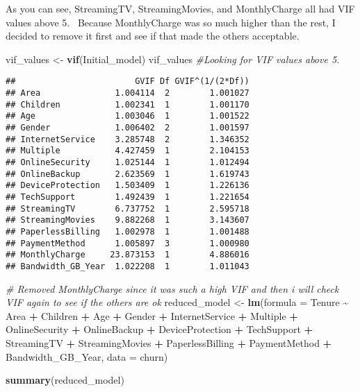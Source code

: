 \documentclass[
]{article}
\newenvironment{Shaded}{\begin{snugshade}}{\end{snugshade}}
\newcommand{\AttributeTok}[1]{\textcolor[rgb]{0.13,0.29,0.53}{#1}}
\newcommand{\CommentTok}[1]{\textcolor[rgb]{0.56,0.35,0.01}{\textit{#1}}}
\newcommand{\FunctionTok}[1]{\textcolor[rgb]{0.13,0.29,0.53}{\textbf{#1}}}
\newcommand{\NormalTok}[1]{#1}
\newcommand{\OtherTok}[1]{\textcolor[rgb]{0.56,0.35,0.01}{#1}}
\newcommand{\SpecialCharTok}[1]{\textcolor[rgb]{0.81,0.36,0.00}{\textbf{#1}}}
\begin{document}
As you can see, StreamingTV, StreamingMovies, and MonthlyCharge all had
VIF values above 5.~ Because MonthlyCharge was so much higher than the
rest, I decided to remove it first and see if that made the others
acceptable.

\begin{Shaded}
\begin{Highlighting}[]
\NormalTok{vif\_values }\OtherTok{\textless{}{-}} \FunctionTok{vif}\NormalTok{(Initial\_model)}
\NormalTok{vif\_values }\CommentTok{\#Looking for VIF values above 5. }
\end{Highlighting}
\end{Shaded}

\begin{verbatim}
##                        GVIF Df GVIF^(1/(2*Df))
## Area               1.004114  2        1.001027
## Children           1.002341  1        1.001170
## Age                1.003046  1        1.001522
## Gender             1.006402  2        1.001597
## InternetService    3.285748  2        1.346352
## Multiple           4.427459  1        2.104153
## OnlineSecurity     1.025144  1        1.012494
## OnlineBackup       2.623569  1        1.619743
## DeviceProtection   1.503409  1        1.226136
## TechSupport        1.492439  1        1.221654
## StreamingTV        6.737752  1        2.595718
## StreamingMovies    9.882268  1        3.143607
## PaperlessBilling   1.002978  1        1.001488
## PaymentMethod      1.005897  3        1.000980
## MonthlyCharge     23.873153  1        4.886016
## Bandwidth_GB_Year  1.022208  1        1.011043
\end{verbatim}

\begin{Shaded}
\begin{Highlighting}[]
\CommentTok{\# Removed MonthlyCharge since it was such a high VIF and then i will check VIF again to see if the others are ok}
\NormalTok{reduced\_model }\OtherTok{\textless{}{-}} \FunctionTok{lm}\NormalTok{(}\AttributeTok{formula =}\NormalTok{ Tenure }\SpecialCharTok{\textasciitilde{}}\NormalTok{ Area }\SpecialCharTok{+}\NormalTok{ Children }\SpecialCharTok{+}\NormalTok{ Age }\SpecialCharTok{+}\NormalTok{ Gender }\SpecialCharTok{+}\NormalTok{ InternetService }\SpecialCharTok{+}\NormalTok{ Multiple }\SpecialCharTok{+}\NormalTok{ OnlineSecurity }\SpecialCharTok{+}\NormalTok{ OnlineBackup }\SpecialCharTok{+}\NormalTok{ DeviceProtection }\SpecialCharTok{+}\NormalTok{ TechSupport }\SpecialCharTok{+}\NormalTok{ StreamingTV }\SpecialCharTok{+}\NormalTok{ StreamingMovies }\SpecialCharTok{+}\NormalTok{ PaperlessBilling }\SpecialCharTok{+}\NormalTok{ PaymentMethod }\SpecialCharTok{+}\NormalTok{ Bandwidth\_GB\_Year, }\AttributeTok{data =}\NormalTok{ churn)}

\FunctionTok{summary}\NormalTok{(reduced\_model)}
\end{Highlighting}
\end{Shaded}
\end{document}
